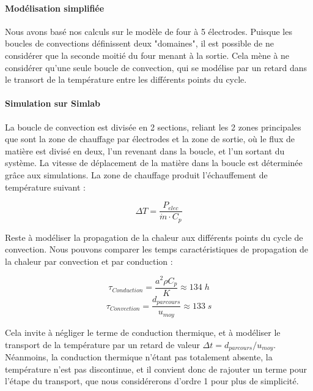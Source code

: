 \documentclass[12pt, a4paper, french, BCOR = 0pt, DIV = 10]{scrartcl}
\begin{document}
    \paragraph{Modélisation simplifiée}
    Nous avons basé nos calculs sur le modèle de four à 5 électrodes. Puisque les boucles de convections définissent deux "domaines", il est possible de ne considérer que la seconde moitié du four menant à la sortie. Cela mène à ne considérer qu'une seule boucle de convection, qui se modélise par un retard dans le transort de la température entre les différents points du cycle.

    \paragraph{Simulation sur Simlab}
    La boucle de convection est divisée en 2 sections, reliant les 2 zones principales que sont la zone de chauffage par électrodes et la zone de sortie, où le flux de matière est divisé en deux, l'un revenant dans la boucle, et l'un sortant du système. La vitesse de déplacement de la matière dans la boucle est déterminée grâce aux simulations. La zone de chauffage produit l'échauffement de température suivant :
    
    $$\Delta T = \frac{P_{elec}}{\dot{m}\cdot C_p}$$
    
    Reste à modéliser la propagation de la chaleur aux différents points du cycle de convection. Nous pouvons comparer les temps caractéristiques de propagation de la chaleur par convection et par conduction :

    $$\tau_{Conduction} = \frac{a^2\rho C_p}{K} \approx 134 \; h$$
    $$\tau_{Convection} = \frac{d_{parcours}}{u_{moy}} \approx 133 \; s$$

    Cela invite à négliger le terme de conduction thermique, et à modéliser le transport de la température par un retard de valeur $\Delta t=d_{parcours}/u_{moy}$. Néanmoins, la conduction thermique n'étant pas totalement absente, la température n'est pas discontinue, et il convient donc de rajouter un terme pour l'étape du transport, que nous considérerons d'ordre 1 pour plus de simplicité.\\
\end{document}

